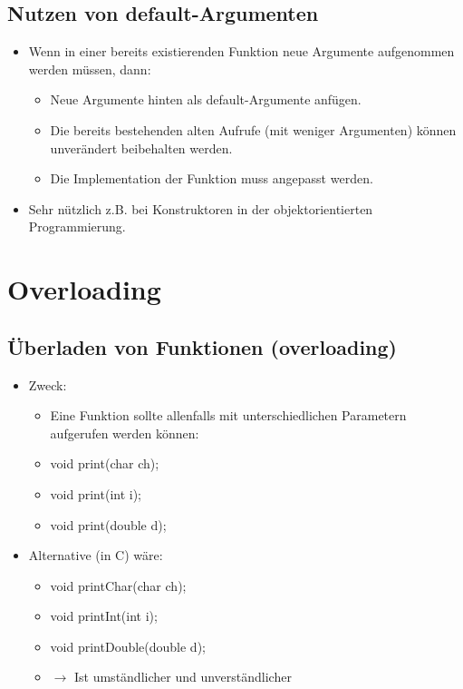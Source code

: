 \subsection{Nutzen von default-Argumenten}
\begin{itemize}
	\item Wenn in einer bereits existierenden Funktion neue Argumente aufgenommen werden müssen, dann:
	\begin{itemize}
		\item Neue Argumente hinten als default-Argumente anfügen.
		\item Die bereits bestehenden alten Aufrufe (mit weniger Argumenten) können unverändert beibehalten werden.
		\item Die Implementation der Funktion muss angepasst werden.
	\end{itemize}
	\item Sehr nützlich z.B. bei Konstruktoren in der objektorientierten Programmierung.
\end{itemize}

\section{Overloading}
\label{sec:Overloading}

\subsection{Überladen von Funktionen (overloading)}
\begin{itemize}
	\item Zweck:
	\begin{itemize}
		\item[\-] Eine Funktion sollte allenfalls mit unterschiedlichen Parametern aufgerufen werden können:
		\item[\-] void print(char ch);
		\item[\-] void print(int i);
		\item[\-] void print(double d);
	\end{itemize}
	\item Alternative (in C) wäre:
	\begin{itemize}
		\item[\-] void printChar(char ch);
		\item[\-] void printInt(int i);
		\item[\-] void printDouble(double d);
		\item[\-] $\rightarrow$ Ist umständlicher und unverständlicher
 	\end{itemize}
\end{itemize}

